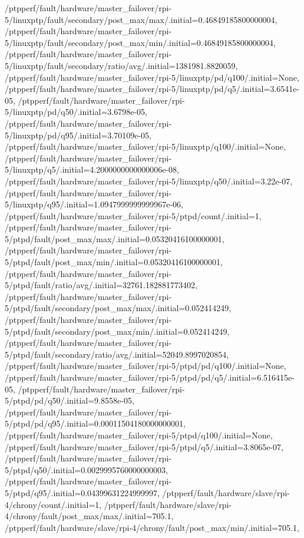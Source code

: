 {    /ptpperf/fault/hardware/master_failover/rpi-5/linuxptp/fault/secondary/post_max/max/.initial=0.46849185800000004,
    /ptpperf/fault/hardware/master_failover/rpi-5/linuxptp/fault/secondary/post_max/min/.initial=0.46849185800000004,
    /ptpperf/fault/hardware/master_failover/rpi-5/linuxptp/fault/secondary/ratio/avg/.initial=1381981.8820059,
    /ptpperf/fault/hardware/master_failover/rpi-5/linuxptp/pd/q100/.initial=None,
    /ptpperf/fault/hardware/master_failover/rpi-5/linuxptp/pd/q5/.initial=3.6541e-05,
    /ptpperf/fault/hardware/master_failover/rpi-5/linuxptp/pd/q50/.initial=3.6798e-05,
    /ptpperf/fault/hardware/master_failover/rpi-5/linuxptp/pd/q95/.initial=3.70109e-05,
    /ptpperf/fault/hardware/master_failover/rpi-5/linuxptp/q100/.initial=None,
    /ptpperf/fault/hardware/master_failover/rpi-5/linuxptp/q5/.initial=4.2000000000000006e-08,
    /ptpperf/fault/hardware/master_failover/rpi-5/linuxptp/q50/.initial=3.22e-07,
    /ptpperf/fault/hardware/master_failover/rpi-5/linuxptp/q95/.initial=1.0947999999999967e-06,
    /ptpperf/fault/hardware/master_failover/rpi-5/ptpd/count/.initial=1,
    /ptpperf/fault/hardware/master_failover/rpi-5/ptpd/fault/post_max/max/.initial=0.05320416100000001,
    /ptpperf/fault/hardware/master_failover/rpi-5/ptpd/fault/post_max/min/.initial=0.05320416100000001,
    /ptpperf/fault/hardware/master_failover/rpi-5/ptpd/fault/ratio/avg/.initial=32761.182881773402,
    /ptpperf/fault/hardware/master_failover/rpi-5/ptpd/fault/secondary/post_max/max/.initial=0.052414249,
    /ptpperf/fault/hardware/master_failover/rpi-5/ptpd/fault/secondary/post_max/min/.initial=0.052414249,
    /ptpperf/fault/hardware/master_failover/rpi-5/ptpd/fault/secondary/ratio/avg/.initial=52049.8997020854,
    /ptpperf/fault/hardware/master_failover/rpi-5/ptpd/pd/q100/.initial=None,
    /ptpperf/fault/hardware/master_failover/rpi-5/ptpd/pd/q5/.initial=6.516415e-05,
    /ptpperf/fault/hardware/master_failover/rpi-5/ptpd/pd/q50/.initial=9.8558e-05,
    /ptpperf/fault/hardware/master_failover/rpi-5/ptpd/pd/q95/.initial=0.00011504180000000001,
    /ptpperf/fault/hardware/master_failover/rpi-5/ptpd/q100/.initial=None,
    /ptpperf/fault/hardware/master_failover/rpi-5/ptpd/q5/.initial=3.8065e-07,
    /ptpperf/fault/hardware/master_failover/rpi-5/ptpd/q50/.initial=0.0029995760000000003,
    /ptpperf/fault/hardware/master_failover/rpi-5/ptpd/q95/.initial=0.04399631224999997,
    /ptpperf/fault/hardware/slave/rpi-4/chrony/count/.initial=1,
    /ptpperf/fault/hardware/slave/rpi-4/chrony/fault/post_max/max/.initial=705.1,
    /ptpperf/fault/hardware/slave/rpi-4/chrony/fault/post_max/min/.initial=705.1,
}
